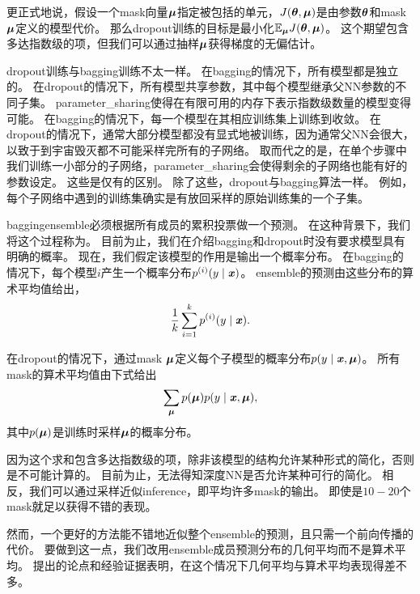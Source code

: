 更正式地说，假设一个\gls{mask}向量$\boldsymbol{\mu}$指定被包括的单元，$J(\boldsymbol{\theta}, \boldsymbol{\mu})$是由参数$\boldsymbol{\theta}$和\gls{mask} $\boldsymbol{\mu}$定义的模型代价。
那么\gls{dropout}训练的目标是最小化$\mathbb{E}_{\boldsymbol{\mu}} J(\boldsymbol{\theta}, \boldsymbol{\mu})$。 
这个期望包含多达指数级的项，但我们可以通过抽样$\boldsymbol{\mu}$获得梯度的无偏估计。

\gls{dropout}训练与\gls{bagging}训练不太一样。
在\gls{bagging}的情况下，所有模型都是独立的。
在\gls{dropout}的情况下，所有模型共享参数，其中每个模型继承父\gls{NN}参数的不同子集。
\gls{parameter_sharing}使得在有限可用的内存下表示指数级数量的模型变得可能。
在\gls{bagging}的情况下，每一个模型在其相应训练集上训练到收敛。
在\gls{dropout}的情况下，通常大部分模型都没有显式地被训练，因为通常父\gls{NN}会很大，以致于到宇宙毁灭都不可能采样完所有的子网络。
取而代之的是，在单个步骤中我们训练一小部分的子网络，\gls{parameter_sharing}会使得剩余的子网络也能有好的参数设定。
这些是仅有的区别。
除了这些，\gls{dropout}与\gls{bagging}算法一样。
例如，每个子网络中遇到的训练集确实是有放回采样的原始训练集的一个子集。

\gls{bagging}\gls{ensemble}必须根据所有成员的累积投票做一个预测。
在这种背景下，我们将这个过程称为。
目前为止，我们在介绍\gls{bagging}和\gls{dropout}时没有要求模型具有明确的概率。
现在，我们假定该模型的作用是输出一个概率分布。
在\gls{bagging}的情况下，每个模型$i$产生一个概率分布$p^{(i)}(y \mid \boldsymbol{\mathit{x}})$。 
\gls{ensemble}的预测由这些分布的算术平均值给出，
\begin{align}
 \frac{1}{k} \sum_{i=1}^k p^{(i)}(y \mid \boldsymbol{\mathit{x}}).
\end{align}

在\gls{dropout}的情况下，通过\gls{mask} $\boldsymbol{\mu}$定义每个子模型的概率分布$p(y \mid \boldsymbol{\mathit{x}}, \boldsymbol{\mu})$。
所有\gls{mask}的算术平均值由下式给出
\begin{align}
  \sum_{\boldsymbol{\mu}} p(\boldsymbol{\mu}) p(y \mid \boldsymbol{\mathit{x}}, \boldsymbol{\mu}),
\end{align}
其中$p(\boldsymbol{\mu})$是训练时采样$\boldsymbol{\mu}$的概率分布。


因为这个求和包含多达指数级的项，除非该模型的结构允许某种形式的简化，否则是不可能计算的。
目前为止，无法得知深度\gls{NN}是否允许某种可行的简化。
相反，我们可以通过采样近似\gls{inference}，即平均许多\gls{mask}的输出。
即使是$10-20$个\gls{mask}就足以获得不错的表现。

然而，一个更好的方法能不错地近似整个\gls{ensemble}的预测，且只需一个前向传播的代价。
要做到这一点，我们改用\gls{ensemble}成员预测分布的几何平均而不是算术平均。
\cite{WardeFarley+al-ICLR2014}提出的论点和经验证据表明，在这个情况下几何平均与算术平均表现得差不多。

